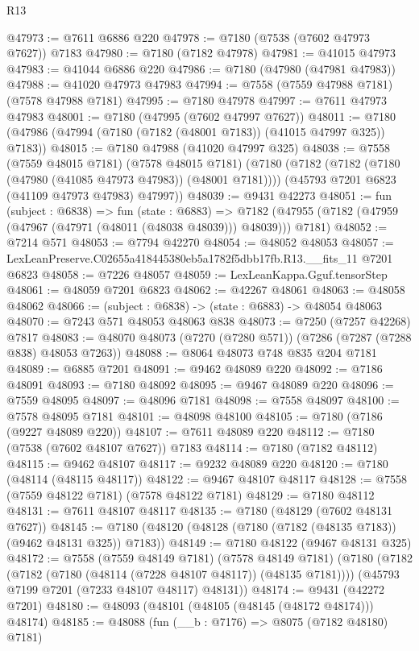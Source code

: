 \begin{lexlean}{R13}
\begin{coremodule}
@47973 := @7611 @6886 @220
@47978 := @7180 (@7538 (@7602 @47973 @7627)) @7183
@47980 := @7180 (@7182 @47978)
@47981 := @41015 @47973
@47983 := @41044 @6886 @220
@47986 := @7180 (@47980 (@47981 @47983))
@47988 := @41020 @47973 @47983
@47994 := @7558 (@7559 @47988 @7181) (@7578 @47988 @7181)
@47995 := @7180 @47978
@47997 := @7611 @47973 @47983
@48001 := @7180 (@47995 (@7602 @47997 @7627))
@48011 := @7180 (@47986 (@47994 (@7180 (@7182 (@48001 @7183)) (@41015 @47997 @325)) @7183))
@48015 := @7180 @47988 (@41020 @47997 @325)
@48038 := @7558
    (@7559 @48015 @7181)
    (@7578 @48015 @7181)
    (@7180
      (@7182 (@7182 (@7180 (@47980 (@41085 @47973 @47983)) (@48001 @7181))))
      (@45793 @7201 @6823 (@41109 @47973 @47983) @47997))
@48039 := @9431 @42273
@48051 := fun (subject : @6838) =>
  fun (state : @6883) =>
  @7182 (@47955 (@7182 (@47959 (@47967 (@47971 (@48011 (@48038 @48039))) @48039))) @7181)
@48052 := @7214 @571
@48053 := @7794 @42270
@48054 := @48052 @48053
@48057 := LexLeanPreserve.C02655a418445380eb5a1782f5dbb17fb.R13.__fits_11 @7201 @6823
@48058 := @7226 @48057
@48059 := LexLeanKappa.Gguf.tensorStep
@48061 := @48059 @7201 @6823
@48062 := @42267 @48061
@48063 := @48058 @48062
@48066 := (subject : @6838) -> (state : @6883) -> @48054 @48063
@48070 := @7243 @571 @48053 @48063 @838
@48073 := @7250 (@7257 @42268) @7817
@48083 := @48070 @48073 (@7270 (@7280 @571)) (@7286 (@7287 (@7288 @838) @48053 @7263))
@48088 := @8064 @48073 @748 @835 @204 @7181
@48089 := @6885 @7201
@48091 := @9462 @48089 @220
@48092 := @7186 @48091
@48093 := @7180 @48092
@48095 := @9467 @48089 @220
@48096 := @7559 @48095
@48097 := @48096 @7181
@48098 := @7558 @48097
@48100 := @7578 @48095 @7181
@48101 := @48098 @48100
@48105 := @7180 (@7186 (@9227 @48089 @220))
@48107 := @7611 @48089 @220
@48112 := @7180 (@7538 (@7602 @48107 @7627)) @7183
@48114 := @7180 (@7182 @48112)
@48115 := @9462 @48107
@48117 := @9232 @48089 @220
@48120 := @7180 (@48114 (@48115 @48117))
@48122 := @9467 @48107 @48117
@48128 := @7558 (@7559 @48122 @7181) (@7578 @48122 @7181)
@48129 := @7180 @48112
@48131 := @7611 @48107 @48117
@48135 := @7180 (@48129 (@7602 @48131 @7627))
@48145 := @7180 (@48120 (@48128 (@7180 (@7182 (@48135 @7183)) (@9462 @48131 @325)) @7183))
@48149 := @7180 @48122 (@9467 @48131 @325)
@48172 := @7558
    (@7559 @48149 @7181)
    (@7578 @48149 @7181)
    (@7180
      (@7182 (@7182 (@7180 (@48114 (@7228 @48107 @48117)) (@48135 @7181))))
      (@45793 @7199 @7201 (@7233 @48107 @48117) @48131))
@48174 := @9431 (@42272 @7201)
@48180 := @48093 (@48101 (@48105 (@48145 (@48172 @48174))) @48174)
@48185 := @48088 (fun (__b : @7176) => @8075 (@7182 @48180) @7181)

\end{coremodule}
\end{lexlean}
